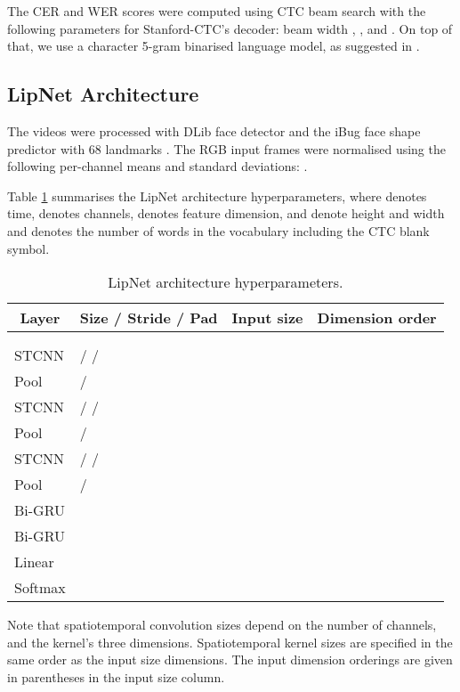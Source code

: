 \documentclass{article}
\begin{document}
The CER and WER scores were computed using CTC beam search with the following parameters for Stanford-CTC's decoder: beam width , , and . On top of that, we use a character 5-gram binarised language model, as suggested in \citep{graves2014towards}.

\subsection{LipNet Architecture}

 The videos were processed with DLib face detector \citep{king2009dlib} and the iBug face shape predictor with 68 landmarks \citep{sagonas2013300}.
 The RGB input frames were normalised using the following per-channel means and standard deviations: .

Table \ref{tbl:arch} summarises the LipNet architecture hyperparameters, where  denotes time,  denotes channels,  denotes feature dimension,  and  denote height and width and  denotes the number of words in the vocabulary including the CTC blank symbol.

\begin{table}[h]
\caption{LipNet architecture hyperparameters.}
\label{tbl:arch}
\begin{center}
\begin{tabular}{llll}
    \multicolumn{1}{c}{\bf Layer}  &\multicolumn{1}{c}{\bf Size / Stride / Pad }  &\multicolumn{1}{c}{\bf Input size} &\multicolumn{1}{l}{\bf Dimension order}
\\ \hline \\            \\
    STCNN  &   /  /   &   & \\
    Pool  &   /   &   &  \\
    STCNN  &   /  /   &   &  \\
    Pool  &   /   &   &  \\
    STCNN  &   /  /   &   &  \\
    Pool  &   /   &   &  \\
    Bi-GRU  &     &    &  \\
    Bi-GRU  &     &    &  \\
    Linear  &    &   &  \\
    Softmax  &   &   & 
\end{tabular} 
\end{center}
\end{table}

Note that spatiotemporal convolution sizes depend on the number of channels, and the kernel's three dimensions. Spatiotemporal kernel sizes are specified in the same order as the input size dimensions. The input dimension orderings are given in parentheses in the input size column.
\end{document}
